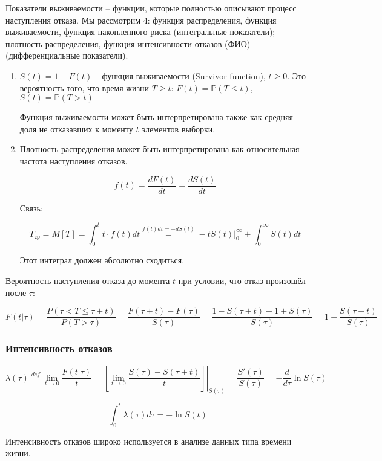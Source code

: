 \documentclass[main.tex]{sufbfiles}
\begin{document}
Показатели выживаемости -- функции, которые полностью описывают процесс наступления отказа.
Мы рассмотрим 4: функция распределения, функция выживаемости, функция накопленного риска (интегральные показатели); плотность распределения, функция интенсивности отказов (ФИО) (дифференциальные показатели).

\begin{enumerate}
	\item $ S(t) = 1 - F(t) $ -- функция выживаемости (Survivor function), $ t \ge 0 $.
	Это вероятность того, что время жизни $  T \ge t $: $ F(t) = \mathds P (T \le t) $, $ S(t) = \mathds P (T > t) $
	
	Функция выживаемости может быть интерпретирована также как средняя доля не отказавших к моменту $ t $ элементов выборки.
	
	\item Плотность распределения может быть интерпретирована как относительная частота наступления отказов.
	
	\[ f(t) = \frac{dF(t)}{dt} = \frac{dS(t)}{dt} \]
	
	Связь:
	
	\[ T_{\text{ср}} = M[T] = \int_0^t t \cdot f(t) dt \overset{f(t) dt = - dS(t)}= - tS(t)|_0^\infty + \int_0^\infty S(t) dt \]
	
	Этот интеграл должен абсолютно сходиться.
	
\end{enumerate}

Вероятность наступления отказа до момента $ t $ при условии, что отказ произошёл после $ \tau $:

\[ F(t | \tau) = \frac{P(\tau < T \le \tau + t)}{P(T > \tau)} = \frac{F(\tau + t) - F(\tau)}{S(\tau)} = \frac{1 - S(\tau + t) - 1 + S(\tau)}{S(\tau)} = 1 - \frac{S(\tau + t)}{ S(\tau) } \]

\subsubsection{Интенсивность отказов}

\[ \lambda(\tau) \overset{def}= \lim_{t \to 0} \frac{F(t | \tau)}{t} = \left[ \lim_{t \to 0} \left. \frac{S(\tau) - S(\tau + t)}{ t } \right] \right|_{S(\tau)} = \frac{S'(\tau)}{S(\tau)} = - \frac{d}{d\tau} \ln S(\tau) \]

\[ \int_0^t \lambda(\tau) d \tau = - \ln S(t) \]

Интенсивность отказов широко используется в анализе данных типа времени жизни.
\end{document}
